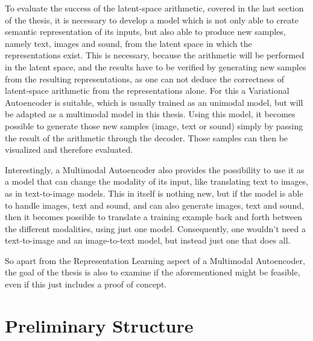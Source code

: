 To evaluate the success of the latent-space arithmetic, covered in the last section of the thesis, it is necessary
to develop a model which is not only able to create semantic representation of its inputs, but also able to
produce new samples, namely text, images and sound, from the latent space in which the representations exist.
This is necessary, because the arithmetic will be performed in the latent space, and the results 
have to be verified by generating new samples from the resulting representations, as one can not deduce
the correctness of latent-space arithmetic from the representations alone.
For this a Variational Autoencoder is suitable, which is usually trained as an unimodal model, but will be
adapted as a multimodal model in this thesis.
Using this model, it becomes possible to generate those new samples (image, text or sound) simply by passing the result of the arithmetic
through the decoder. Those samples can then be visualized and therefore evaluated.

Interestingly, a Multimodal Autoencoder also provides the possibility to use it as a model
that can change the modality of its input, like translating text to images, as in text-to-image models.
This in itself is nothing new, but if the model is able to handle images, text and sound, and can also
generate images, text and sound, then it becomes possible to translate a training example
back and forth between the different modalities, using just one model. Consequently, one wouldn't need
a text-to-image and an image-to-text model, but instead just one that does all.

So apart from the Representation Learning
aspect of a Multimodal Autoencoder, the goal of the thesis is also to examine if the aforementioned might
be feasible, even if this just includes a proof of concept.

\chapter{Preliminary Structure}

